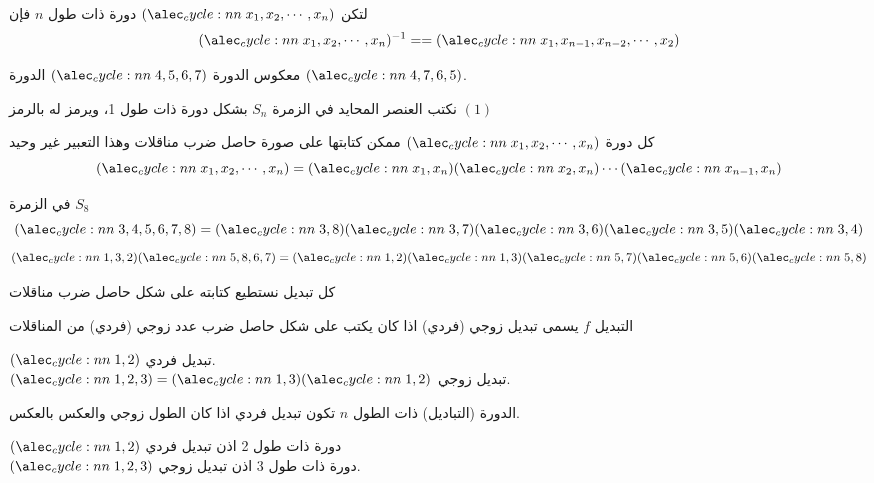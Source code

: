 \begin{note}
	لتكن $\cycle{x_1, x_2, \cdots, x_n}$ دورة ذات طول $n$ فإن
	\[
	\cycle{x_1, x_2, \cdots, x_n}^{-1} = = \cycle{x_1, x_{n-1}, x_{n-2}, \cdots, x_2}
	\]
\end{note}

\begin{example}
	معكوس الدورة $\cycle{4,5,6,7}$ الدورة $\cycle{4, 7,6,5}$.
\end{example}

\begin{note}
	نكتب العنصر المحايد في الزمرة $S_n$ بشكل دورة ذات طول 1، ويرمز له  بالرمز $(1)$
\end{note}

\begin{theorem}
	كل دورة $\cycle{x_1, x_2, \cdots, x_n}$ ممكن كتابتها على صورة حاصل ضرب مناقلات وهذا التعبير غير وحيد
	\[
	\cycle{x_1, x_2, \cdots, x_n} = \cycle{x_1, x_n}\cycle{x_2, x_n}\cdots\cycle{x_{n-1}, x_n}
	\]
\end{theorem}
\begin{example}
	في الزمرة $S_8$ 
	\[
	\cycle{3,4,5,6,7,8} = \cycle{3, 8} \cycle{3, 7} \cycle{3, 6} \cycle{3, 5} \cycle{3, 4}
	\]
	\[
	\cycle{1,3,2}\cycle{5,8,6,7} =  \cycle{1,2 } \cycle{1,3} \cycle{5,7 }  \cycle{5,6 }\cycle{5,8}
	\]
\end{example}

\begin{corollary}
	كل تبديل نستطيع كتابته على شكل حاصل ضرب مناقلات
\end{corollary}

\begin{definition}
	التبديل $f$ يسمى تبديل زوجي (فردي) اذا كان يكتب على شكل حاصل ضرب عدد زوجي (فردي) من المناقلات
\end{definition}

\begin{example}
	$\cycle{1,2}$ تبديل فردي.\\
	$\cycle{1,2,3} = \cycle{1,3}\cycle{1,2}$ تبديل زوجي.
\end{example}

\begin{note}
	الدورة (التباديل) ذات الطول $n$ تكون تبديل فردي اذا كان الطول زوجي والعكس بالعكس.
\end{note}

\begin{example}
	$\cycle{1,2}$ دورة ذات طول 2 اذن تبديل فردي\\
	$\cycle{1,2,3}$ دورة ذات طول 3 اذن تبديل زوجي.
\end{example}

